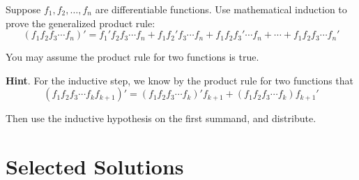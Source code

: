 \documentclass[10pt,]{book}
\theoremstyle{plain}
\theoremstyle{definition}
\theoremstyle{definition}
\theoremstyle{definition}
\theoremstyle{definition}
\numberwithin{equation}{chapter}
\begin{document}
\begin{divisionexercise}{23}\hypertarget{exercise-278}{}
\hypertarget{p-2227}{}%
Suppose \(f_1, f_2, \ldots, f_n\) are differentiable functions. Use mathematical induction to prove the generalized product rule:%
\begin{equation*}
(f_1 f_2 f_3 \cdots f_n)' = f_1' f_2 f_3 \cdots f_n + f_1 f_2' f_3 \cdots f_n + f_1 f_2 f_3' \cdots f_n + \cdots + f_1 f_2 f_3 \cdots f_n'
\end{equation*}
%
\par
\hypertarget{p-2228}{}%
You may assume the product rule for two functions is true.%
\par\smallskip%
\noindent\textbf{Hint}.\hypertarget{hint-75}{}\quad%
\hypertarget{p-2229}{}%
For the inductive step, we know by the product rule for two functions that%
\begin{equation*}
(f_1f_2f_3 \cdots f_k f_{k+1})' = (f_1f_2f_3\cdots f_k)'f_{k+1} + (f_1f_2f_3\cdots f_k)f_{k+1}'
\end{equation*}
%
\par
\hypertarget{p-2230}{}%
Then use the inductive hypothesis on the first summand, and distribute.%
\end{divisionexercise}%
\typeout{************************************************}
\typeout{************************************************}
\chapter[{Selected Solutions}]{Selected Solutions}\label{appendix-3}
\end{document}
